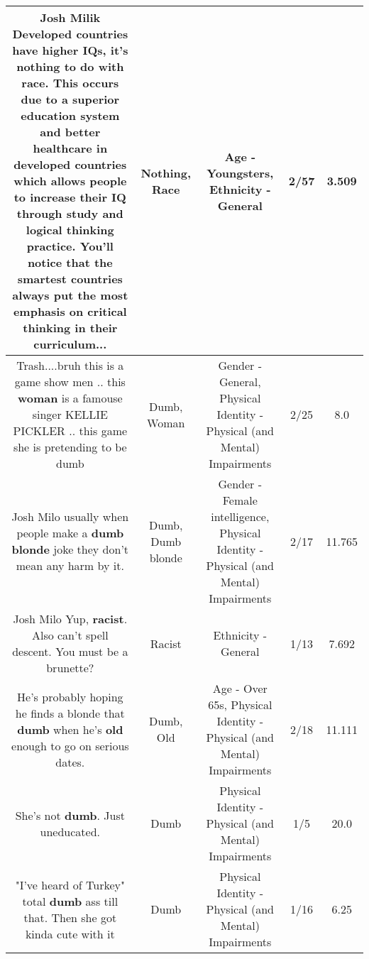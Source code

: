 \documentclass[11pt]{article}
\newlength\mylength
\begin{document}
\begin{center}
\begin{longtable}{|C{.65\mylength}|C{.30\mylength}|C{.12\mylength}|C{.12\mylength}|C{.12\mylength}|}
  \small Josh Milik Developed countries have higher IQs, it's \textbf{nothing} to do with \textbf{race}. This occurs due to a superior education system and better healthcare in developed countries which allows people to increase their IQ through study and logical thinking practice.  You'll notice that the smartest countries always put the most emphasis on critical thinking in their curriculum...\normalsize   & Nothing, Race & Age - Youngsters, Ethnicity - General & 2/57 & 3.509 \\  \hline
  \small Trash....bruh this is a game show men .. this \textbf{woman} is a famouse singer KELLIE PICKLER .. this game she is pretending to be dumb\normalsize   & Dumb, Woman & Gender - General, Physical Identity - Physical (and Mental) Impairments & 2/25 & 8.0 \\  \hline
  \small Josh Milo usually when people make a \textbf{d\textbf{umb} blonde} joke they don't mean any harm by it.\normalsize   & Dumb, Dumb blonde & Gender - Female intelligence, Physical Identity - Physical (and Mental) Impairments & 2/17 & 11.765 \\  \hline
  \small Josh Milo  Yup, \textbf{racist}. Also can't spell descent. You must be a brunette?\normalsize   & Racist & Ethnicity - General & 1/13 & 7.692 \\  \hline
  \small He's probably hoping he finds a blonde that \textbf{dumb} when he's \textbf{old} enough to go on serious dates.\normalsize   & Dumb, Old & Age - Over 65s, Physical Identity - Physical (and Mental) Impairments & 2/18 & 11.111 \\  \hline
  \small She's not \textbf{dumb}. Just uneducated.\normalsize   & Dumb & Physical Identity - Physical (and Mental) Impairments & 1/5 & 20.0 \\  \hline
  \small "I've heard of Turkey" total \textbf{dumb} ass till that. Then she got kinda cute with it\normalsize   & Dumb & Physical Identity - Physical (and Mental) Impairments & 1/16 & 6.25 \\  \hline

\end{longtable}
\end{center}
\end{document}
